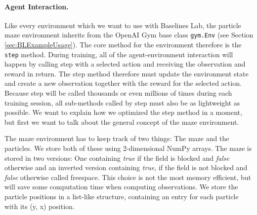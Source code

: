 \paragraph{Agent Interaction.}
Like every environment which we want to use with Baselines Lab, the particle maze environment inherits from the OpenAI Gym base class \texttt{gym.Env} (see Section \ref{sec:BLExampleUsage}). The core method for the environment therefore is the \texttt{step} method. During training, all of the agent-environment interaction will happen by calling step with a selected action and receiving the observation and reward in return. The step method therefore must update the environment state and create a new observation together with the reward for the selected action. Because step will be called thousands or even millions of times during each training session, all sub-methods called by step must also be as lightweight as possible. We want to explain how we optimized the step method in a moment, but first we want to talk about the general concept of the maze environment.

The maze environment has to keep track of two things: The maze and the particles. We store both of these using 2-dimensional NumPy arrays. The maze is stored in two versions: One containing \textit{true} if the field is blocked and \textit{false} otherwise and an inverted version containing \textit{true}, if the field is not blocked and \textit{false} otherwise called freespace. This choice is not the most memory efficient, but will save some computation time when computing observations. We store the particle positions in a list-like structure, containing an entry for each particle with its (y, x) position. 

